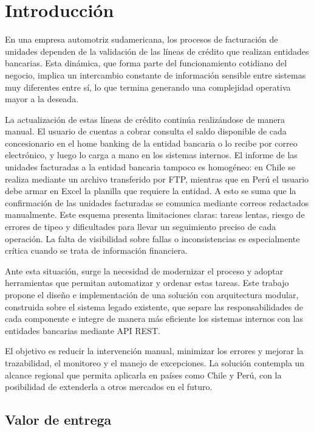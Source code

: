\chapter{Introducción}\label{cap:introduccion}

En una empresa automotriz sudamericana, los procesos de facturación de unidades dependen de la validación de las líneas de crédito que realizan entidades bancarias. Esta dinámica, que forma parte del funcionamiento cotidiano del negocio, implica un intercambio constante de información sensible entre sistemas muy diferentes entre sí, lo que termina generando una complejidad operativa mayor a la deseada.

La actualización de estas líneas de crédito continúa realizándose de manera manual. El usuario de cuentas a cobrar consulta el saldo disponible de cada concesionario en el home banking de la entidad bancaria o lo recibe por correo electrónico, y luego lo carga a mano en los sistemas internos. El informe de las unidades facturadas a la entidad bancaria tampoco es homogéneo: en Chile se realiza mediante un archivo transferido por FTP, mientras que en Perú el usuario debe armar en Excel la planilla que requiere la entidad. A esto se suma que la confirmación de las unidades facturadas se comunica mediante correos redactados manualmente. Este esquema presenta limitaciones claras: tareas lentas, riesgo de errores de tipeo y dificultades para llevar un seguimiento preciso de cada operación. La falta de visibilidad sobre fallas o inconsistencias es especialmente crítica cuando se trata de información financiera.

Ante esta situación, surge la necesidad de modernizar el proceso y adoptar herramientas que permitan automatizar y ordenar estas tareas. Este trabajo propone el diseño e implementación de una solución con arquitectura modular, construida sobre el sistema legado existente, que separe las responsabilidades de cada componente e integre de manera más eficiente los sistemas internos con las entidades bancarias mediante API REST.

El objetivo es reducir la intervención manual, minimizar los errores y mejorar la trazabilidad, el monitoreo y el manejo de excepciones. La solución contempla un alcance regional que permita aplicarla en países como Chile y Perú, con la posibilidad de extenderla a otros mercados en el futuro.

\section{Valor de entrega}

